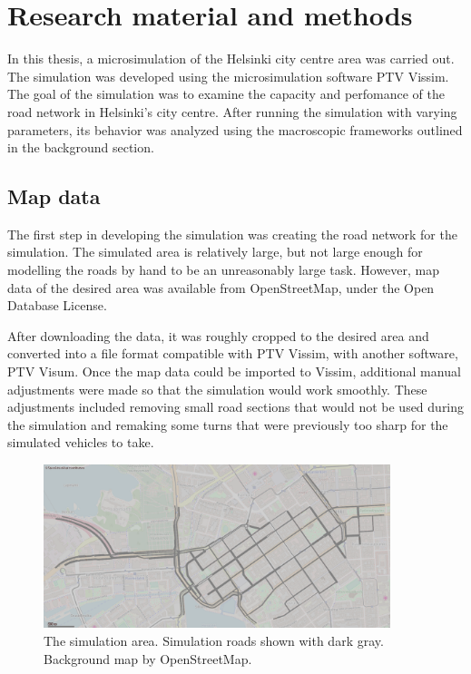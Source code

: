 \documentclass[english, 12pt, a4paper, elec, utf8, pdfa, online]{aaltothesis}
\begin{document}
\clearpage

\section{Research material and methods} \label{experiment}

In this thesis, a microsimulation of the Helsinki city centre area was carried out. The simulation was developed using the microsimulation software PTV Vissim. The goal of the simulation was to examine the capacity and perfomance of the road network in Helsinki's city centre. After running the simulation with varying parameters, its behavior was analyzed using the macroscopic frameworks outlined in the background section.

\subsection{Map data}

The first step in developing the simulation was creating the road network for the simulation. The simulated area is relatively large, but not large enough for modelling the roads by hand to be an unreasonably large task. However, map data of the desired area was available from OpenStreetMap, under the Open Database License. \cite{osm}

After downloading the data, it was roughly cropped to the desired area and converted into a file format compatible with PTV Vissim, with another software, PTV Visum. Once the map data could be imported to Vissim, additional manual adjustments were made so that the simulation would work smoothly. These adjustments included removing small road sections that would not be used during the simulation and remaking some turns that were previously too sharp for the simulated vehicles to take.

\begin{figure}[h]
    \centering
    \includegraphics[width=0.9\textwidth]{graphs/vissim_map}
    \caption{The simulation area. Simulation roads shown with dark gray. Background map by OpenStreetMap\cite{osm}.}
\end{figure}
\end{document}
